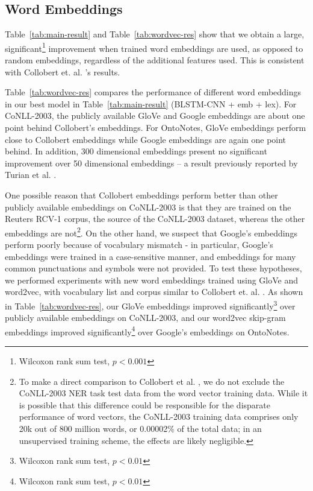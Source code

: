 \documentclass[11pt,letterpaper]{article}
\begin{document}
\subsection{Word Embeddings}

Table~\ref{tab:main-result} and Table~\ref{tab:wordvec-res} show that we obtain a large, significant\footnote{Wilcoxon rank sum test, $p < 0.001$} improvement when trained word embeddings are used, as opposed to random embeddings, regardless of the additional features used. This is consistent with  Collobert et. al. 's results.

Table~\ref{tab:wordvec-res} compares the performance of different word embeddings in our best model in Table~\ref{tab:main-result} (BLSTM-CNN + emb + lex). For CoNLL-2003, the publicly available GloVe and Google embeddings are about one point behind Collobert's embeddings. For OntoNotes, GloVe embeddings perform close to Collobert embeddings while Google embeddings are again one point behind. In addition, 300 dimensional embeddings present no significant improvement over 50 dimensional embeddings \--- a result previously reported by Turian et al. .

One possible reason that Collobert embeddings perform better than other publicly available embeddings on CoNLL-2003 is that they are trained on the Reuters RCV-1 corpus, the source of the CoNLL-2003 dataset, whereas the other embeddings are not\footnote{To make a direct comparison to Collobert et al. , we do not exclude the CoNLL-2003 NER task test data from the word vector training data. While it is possible that this difference could be responsible for the disparate performance of word vectors, the CoNLL-2003 training data comprises only 20k out of 800 million words, or 0.00002\% of the total data; in an unsupervised training scheme, the effects are likely negligible.}. On the other hand, we suspect that Google's embeddings perform poorly because of vocabulary mismatch \-- in particular, Google's embeddings were trained in a case-sensitive manner, and embeddings for many common punctuations and symbols were not provided. To test these hypotheses, we performed experiments with new word embeddings trained using GloVe and word2vec, with vocabulary list and corpus similar to Collobert et. al. . As shown in Table~\ref{tab:wordvec-res}, our GloVe embeddings improved significantly\footnote{Wilcoxon rank sum test, $p < 0.01$} over publicly available embeddings on CoNLL-2003, and our word2vec skip-gram  embeddings improved significantly\footnote{Wilcoxon rank sum test, $p < 0.01$} over Google's embeddings on OntoNotes. %
\end{document}
